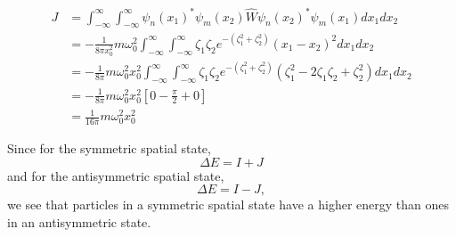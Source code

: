 \documentclass[10pt]{article}
\begin{document}
\begin{enumerate}
\begin{enumerate}
    \begin{align*}
      J &= \int_{-\infty}^{\infty} \int_{-\infty}^{\infty} \psi_n \left( x_1 \right) ^* \psi_m \left( x_2 \right) \hat{W} \psi_n \left( x_2 \right) ^* \psi_m \left( x_1 \right) d x_1 d x_2 \\
      &= -\frac{1}{8\pi x_0 ^2} m \omega_0 ^2 \int_{-\infty}^{\infty} \int_{-\infty}^{\infty} \zeta_1 \zeta_2 e ^ {- \left( \zeta_1^2+\zeta_2^2 \right)} \left( x_1-x_2 \right)^2 d x_1 d x_2 \\
      &= -\frac{1}{8\pi} m \omega_0 ^2 x_0^2 \int_{-\infty}^{\infty} \int_{-\infty}^{\infty} \zeta_1 \zeta_2 e ^ {- \left( \zeta_1^2+\zeta_2^2 \right)} \left( \zeta_1^2 - 2 \zeta_1 \zeta_2 + \zeta_2 ^2 \right) d x_1 d x_2 \\
      &= -\frac{1}{8\pi} m \omega_0 ^2 x_0^2 \left[ 0 - \frac{\pi}{2} + 0 \right] \\
      &= \frac{1}{16\pi} m \omega_0 ^2 x_0^2 
    \end{align*}

    Since for the symmetric spatial state, 
    \[
      \Delta E = I + J
    \]
    and for the antisymmetric spatial state,
    \[
      \Delta E = I - J
    ,\]
    we see that particles in a symmetric spatial state have a higher energy than ones in an antisymmetric state.
    
  \end{enumerate}
\end{enumerate}
\end{document}
